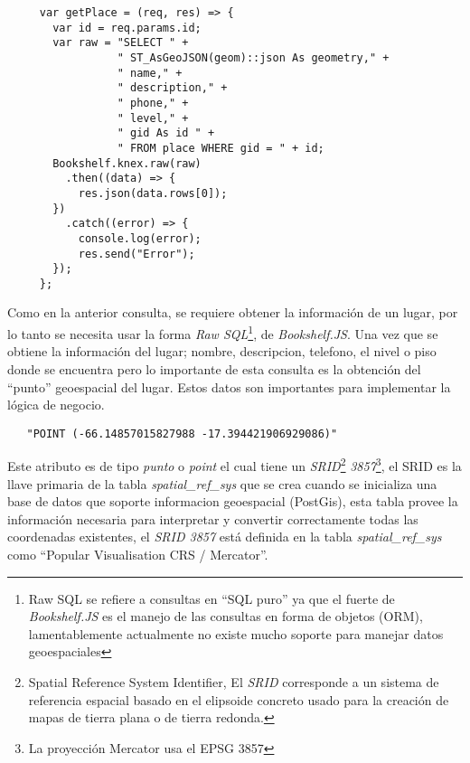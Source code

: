  \begin{center}
   \begin{verbatim}
     var getPlace = (req, res) => {
       var id = req.params.id;
       var raw = "SELECT " +
                 " ST_AsGeoJSON(geom)::json As geometry," +
                 " name," +
                 " description," +
                 " phone," +
                 " level," +
                 " gid As id " +
                 " FROM place WHERE gid = " + id;
       Bookshelf.knex.raw(raw)
         .then((data) => {
           res.json(data.rows[0]);
       })
         .catch((error) => {
           console.log(error);
           res.send("Error");
       });
     };
   \end{verbatim}
 \end{center}

Como en la anterior consulta, se requiere obtener la información de un lugar, por lo tanto se necesita  usar la forma \emph{Raw SQL}\footnote{Raw SQL se refiere a consultas en ``SQL puro'' ya que el fuerte de \emph{Bookshelf.JS} es el manejo de las consultas en forma de objetos (ORM), lamentablemente actualmente no existe mucho soporte para manejar datos geoespaciales}, de \emph{Bookshelf.JS}.
Una vez que se obtiene la información del lugar; nombre, descripcion, telefono, el nivel o piso donde se encuentra pero lo importante de esta consulta es la obtención del ``punto'' geoespacial del lugar. Estos datos son importantes para implementar la lógica de negocio.\\


\begin{center}
 \begin{verbatim}
   "POINT (-66.14857015827988 -17.394421906929086)"
 \end{verbatim}
\end{center}



Este atributo es de tipo \emph{punto} o \emph{point} el cual tiene un \emph{SRID}\footnote{ Spatial Reference System Identifier, El \emph{SRID} corresponde a un sistema de referencia espacial basado en el elipsoide concreto usado para la creación de mapas de tierra plana o de tierra redonda.\cite{msdn_srid} } \emph{3857}\footnote{La proyección Mercator usa el EPSG 3857}, el SRID  es la llave primaria de la tabla \emph{spatial\_ref\_sys} que se crea cuando se inicializa una base de datos que soporte informacion geoespacial (PostGis), esta tabla provee la información necesaria para interpretar y convertir correctamente todas las coordenadas existentes, el \emph{SRID 3857} está definida en la tabla \emph{spatial\_ref\_sys} como ``Popular Visualisation CRS / Mercator''.\\


